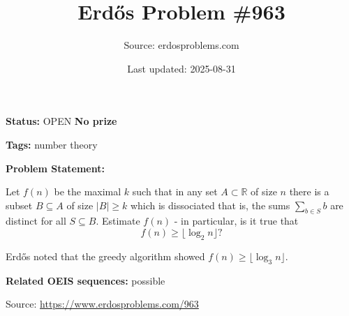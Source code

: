\documentclass{article}
\title{Erd\H{o}s Problem \#963}
\date{Last updated: 2025-08-31}
\author{Source: erdosproblems.com}
\begin{document}
\maketitle

\noindent\textbf{Status:} OPEN \quad \textbf{No prize}

\noindent\textbf{Tags:} number theory

\medskip

\noindent\textbf{Problem Statement:}

Let $f(n)$ be the maximal $k$ such that in any set $A\subset \mathbb{R}$ of size $n$ there is a subset $B\subseteq A$ of size $\lvert B\rvert\geq k$ which is dissociated that is, the sums $\sum_{b\in S}b$ are distinct for all $S\subseteq B$. Estimate $f(n)$ - in particular, is it true that\[f(n)\geq \lfloor \log_2 n\rfloor?\]




Erd\H{o}s noted that the greedy algorithm showed $f(n)\geq \lfloor \log_3 n\rfloor$.

\noindent\textbf{Related OEIS sequences:} possible


\bigskip
\noindent\small{Source: \url{https://www.erdosproblems.com/963}}
\end{document}
